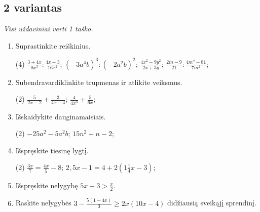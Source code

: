 \documentclass[a4paper]{article}
\begin{document}
\vspace*{12mm}

\subsection*{2 variantas}

\textit{Visi uždaviniai verti 1 taško.}

\begin{enumerate}
      \item Suprastinkite reiškinius.
            \begin{tasks}[item-format={\normalfont}, after-item-skip=2mm](4)
                  \task $\frac{3+4x}{8x^3}:\frac{4x+3}{16x^2}$;
                  \task $(-3a^4b)^3:(-2a^2b)^2$;
                  \task $\frac{4x^2-9y^2}{2x+3y}$;
                  \task $\frac{2m-9}{21}:\frac{4m^2-81}{7m^2}$;
            \end{tasks}

      \item Subendravardiklinkite trupmenas ir atlikite veiksmus.
            \begin{tasks}[item-format={\normalfont}, after-item-skip=2mm](2)
                  \task $\frac{5}{2x-2}+\frac{3}{4x-4}$;
                  \task $\frac{4}{4x^3}+\frac{5}{6x}$;
            \end{tasks}

      \item Išskaidykite dauginamaisiais.
            \begin{tasks}[item-format={\normalfont}, after-item-skip=2mm](2)
                  \task $-25a^2-5a^2b$;
                  \task $15n^2+n-2$;
            \end{tasks}

      \item Išspręskite tiesinę lygtį.
            \begin{tasks}[item-format={\normalfont}, after-item-skip=2mm](2)
                  \task $\frac{3x}{7}=\frac{4x}{5}-8$;
                  \task $2,5x-1=4+2(1\frac{1}{4}x-3)$;
            \end{tasks}

      \item Išspręskite nelygybę $5x-3>\frac{x}{2}$.
      \item Raskite nelygybės $3-\frac{5(1-4x)}{3}\geq2x(10x-4)$ didžiausią sveikąjį sprendinį.
\end{enumerate}
\vspace*{12mm}
\end{document}
